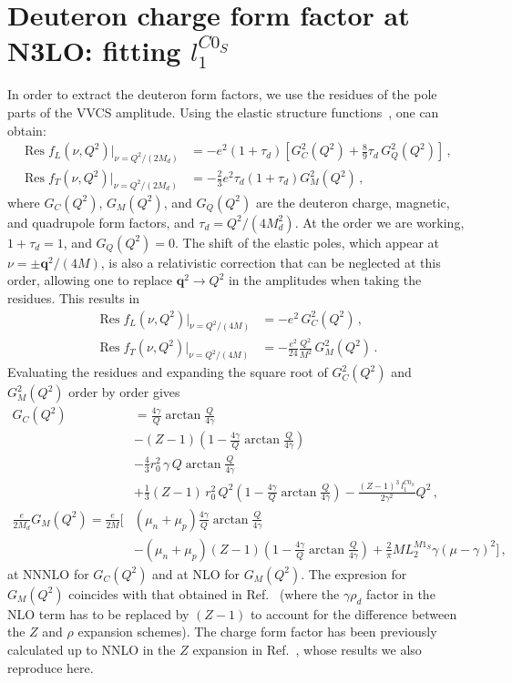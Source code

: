 \documentclass[prl,
twocolumn,
showpacs,preprintnumbers,amsmath,amssymb,
superscriptaddress,
a4paper,nofootinbib,longbibliography]{revtex4-2}
\def\bv#1{\boldsymbol{#1}}
\DeclareMathOperator*{\res}{Res}
\begin{document}
\section{Deuteron charge form factor at N3LO: fitting \boldmath $l_1^{C0_S}$}
In order to extract the deuteron form factors, we use the residues of the pole parts of the VVCS amplitude. Using the elastic structure functions~\cite{Carlson:2013xea}, one can obtain:
\begin{align}
    \res f_L(\nu,Q^2)\big|_{\nu=Q^2/(2M_d)} & = - e^2\left(1+\tau_d\right)
    \left[G_C^2(Q^2)+\frac{8}{9}\tau_d\,G_Q^2(Q^2)\right]\,,\\
    \res f_T(\nu,Q^2)\big|_{\nu=Q^2/(2M_d)} & = -\frac{2}{3}e^2 \tau_d\left(1+\tau_d\right) G_M^2(Q^2)\,,
\end{align}
where $G_C(Q^2)$, $G_M(Q^2)$, and $G_Q(Q^2)$ are the deuteron charge, magnetic, and quadrupole form factors, and $\tau_d=Q^2/(4M_d^2)$. At the order we are working, $1+\tau_d=1$, and $G_Q(Q^2)=0$. The shift of the elastic poles, which appear at $\nu=\pm\bv{q}^2/(4M)$, is also a relativistic correction that can be neglected at this order, allowing one to replace $\bv{q}^2\to Q^2$ in the amplitudes when taking the residues. This results in
\begin{align}
    \res f_L(\nu,Q^2)\big|_{\nu=Q^2/(4M)} & = - e^2\, G_C^2(Q^2)\,,\\
    \res f_T(\nu,Q^2)\big|_{\nu=Q^2/(4M)} & = -\frac{e^2}{24}\frac{Q^2}{M^2}\, G_M^2(Q^2)\,.
\end{align}
Evaluating the residues and expanding the square root of $G_C^2(Q^2)$ and $G_M^2(Q^2)$ order by order gives
\begin{align}
    G_C(Q^2) & =\frac{4 \gamma}{Q} \arctan\frac{Q}{4 \gamma } \nonumber\\
    & -(Z-1) \left(1-\frac{4 \gamma}{Q}\arctan\frac{Q}{4 \gamma}\right)\nonumber\\
    &-\frac{4}{3}r_0^2\, \gamma\,  Q  \arctan\frac{Q}{4 \gamma } \nonumber\\
    &+\frac{1}{3}(Z-1)\, r_0^2\,  Q^2\left(1-\frac{4 \gamma}{Q}\arctan\frac{Q}{4 \gamma }\right)-\frac{(Z-1)^3\,l_1^{C0_S}}{2 \gamma ^2} Q^2 \,, \\
   \frac{e}{2M_d} G_M(Q^2) = \frac{e}{2M}\Bigg[& (\mu_n+\mu_p)\frac{4\gamma}{Q}\arctan\frac{Q}{4\gamma}\nonumber\\
    &-(\mu_n+\mu_p)(Z-1)\left(1-\frac{4\gamma}{Q}\arctan\frac{Q}{4\gamma}\right)
    +\frac{2}{\pi}M L_2^{M1_S}\gamma(\mu-\gamma)^2
    \Bigg]\,,
\end{align}
at NNNLO for $G_C(Q^2)$ and at NLO for $G_M(Q^2)$. The expresion for $G_M(Q^2)$ coincides with that obtained in Ref.~\cite{Chen:1999tn} (where the $\gamma \rho_d$ factor in the NLO term has to be replaced by $(Z-1)$ to account for the difference between the $Z$ and $\rho$ expansion schemes). The charge form factor has been previously calculated up to NNLO in the $Z$ expansion in Ref.~\cite{Phillips:1999hh}, whose results we also reproduce here.
\end{document}
